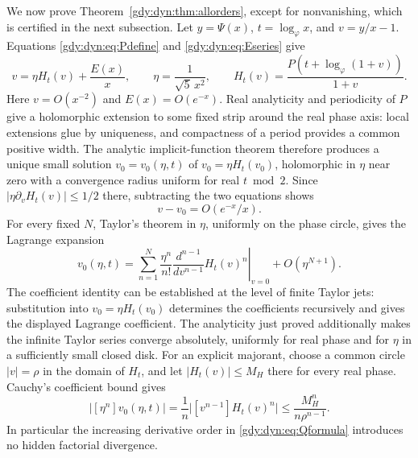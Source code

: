 \documentclass[11pt]{article}
\numberwithin{equation}{section}
\theoremstyle{definition}
\theoremstyle{remark}
\begin{document}
We now prove Theorem~\ref{gdy:dyn:thm:allorders}, except for nonvanishing,
which is certified in the next subsection. Let $y=\Psi(x)$,
$t=\log_\varphi x$, and $v=y/x-1$. Equations
\eqref{gdy:dyn:eq:Pdefine} and \eqref{gdy:dyn:eq:Eseries} give
\begin{equation}\label{gdy:dyn:eq:scaledimplicit}
 v=\eta H_t(v)+\frac{E(x)}x,\qquad
 \eta=\frac1{\sqrt5\,x^2},\qquad
 H_t(v)=\frac{P(t+\log_\varphi(1+v))}{1+v}.
\end{equation}
Here $v=O(x^{-2})$ and $E(x)=O(e^{-x})$. Real analyticity and periodicity
of $P$ give a holomorphic extension to some fixed strip around the real
phase axis: local extensions glue by uniqueness, and compactness of a
period provides a common positive width. The analytic implicit-function
theorem therefore produces a unique small solution
$v_0=v_0(\eta,t)$ of $v_0=\eta H_t(v_0)$, holomorphic in $\eta$ near
zero with a convergence radius uniform for real $t\bmod2$. Since
$|\eta\partial_vH_t(v)|\le1/2$ there, subtracting the two
equations shows
\begin{equation}\label{gdy:dyn:eq:vcompare}
 v-v_0=O(e^{-x}/x).
\end{equation}
For every fixed $N$, Taylor's theorem in $\eta$, uniformly on the phase
circle, gives the Lagrange expansion
\begin{equation}\label{gdy:dyn:eq:lagrange}
 v_0(\eta,t)=\sum_{n=1}^{N}\frac{\eta^n}{n!}
 \left.\frac{d^{n-1}}{dv^{n-1}}H_t(v)^n\right|_{v=0}
 +O(\eta^{N+1}).
\end{equation}
The coefficient identity can be established at the level of finite
Taylor jets: substitution into $v_0=\eta H_t(v_0)$ determines the
coefficients recursively and gives the displayed Lagrange coefficient.
The analyticity just proved additionally makes the infinite Taylor
series converge absolutely, uniformly for real phase and for $\eta$ in
a sufficiently small closed disk.
For an explicit majorant, choose a common circle $|v|=\rho$ in the
domain of $H_t$, and let $|H_t(v)|\le M_H$ there for every real phase.
Cauchy's coefficient bound gives
\[
 \bigl|[\eta^n]v_0(\eta,t)\bigr|
 =\frac1n\bigl|[v^{n-1}]H_t(v)^n\bigr|
 \le\frac{M_H^n}{n\rho^{n-1}}.
\]
In particular the increasing derivative order in
\eqref{gdy:dyn:eq:Qformula} introduces no hidden factorial divergence.
\end{document}
